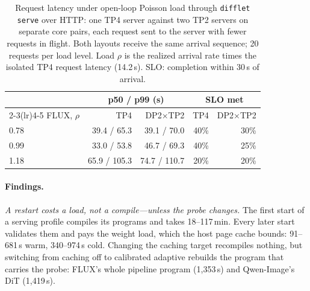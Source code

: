 \begin{table}[t]
\caption{Request latency under open-loop Poisson load through \texttt{difflet serve} over HTTP: one TP4 server against two TP2 servers on separate core pairs, each request sent to the server with fewer requests in flight. Both layouts receive the same arrival sequence; 20 requests per load level. Load $\rho$ is the realized arrival rate times the isolated TP4 request latency (14.2\,s). SLO: completion within 30\,s of arrival.}
\label{tab:serving-load}
\centering
\footnotesize
\setlength{\tabcolsep}{3pt}
\begin{tabular}{@{}lrrrr@{}}
\toprule
& \multicolumn{2}{c}{p50 / p99 (s)} & \multicolumn{2}{c}{SLO met} \\
\cmidrule(lr){2-3}\cmidrule(lr){4-5}
FLUX, $\rho$ & TP4 & DP2$\times$TP2 & TP4 & DP2$\times$TP2 \\
\midrule
0.78 & 39.4 / 65.3  & 39.1 / 70.0  & 40\% & 30\% \\
0.99 & 33.0 / 53.8  & 46.7 / 69.3  & 40\% & 25\% \\
1.18 & 65.9 / 105.3 & 74.7 / 110.7 & 20\% & 20\% \\
\bottomrule
\end{tabular}
\vskip -0.1in
\end{table}

\paragraph{Findings.}
\emph{A restart costs a load, not a compile---unless the probe changes.} The first start of a serving profile compiles its programs and takes 18--117\,min. Every later start validates them and pays the weight load, which the host page cache bounds: 91--681\,s warm, 340--974\,s cold. Changing the caching target recompiles nothing, but switching from caching off to calibrated adaptive rebuilds the program that carries the probe: FLUX's whole pipeline program (1{,}353\,s) and Qwen-Image's DiT (1{,}419\,s).

